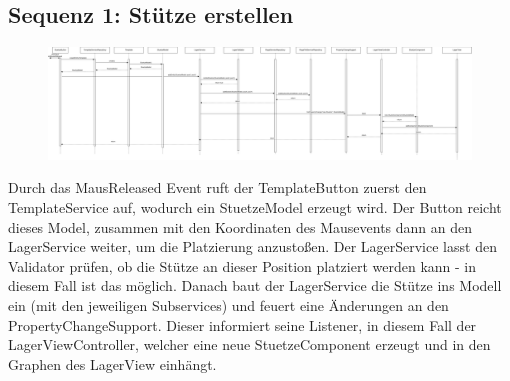 \subsection{Sequenz 1: Stütze erstellen}
\begin{figure}[H]
    \includegraphics[width=\linewidth]{images/laufzeitsicht/Sequenz_David.png}
    \label{fig:Sequenzdiagramm1}
\end{figure}
Durch das MausReleased Event ruft der TemplateButton zuerst den TemplateService auf, wodurch ein StuetzeModel erzeugt wird. Der Button reicht dieses Model, zusammen mit den Koordinaten des Mausevents dann an den LagerService weiter, um die Platzierung anzustoßen. Der LagerService lasst den Validator prüfen, ob die Stütze an dieser Position platziert werden kann - in diesem Fall ist das möglich. Danach baut der LagerService die Stütze ins Modell ein (mit den jeweiligen Subservices) und feuert eine Änderungen an den PropertyChangeSupport. Dieser informiert seine Listener, in diesem Fall der LagerViewController, welcher eine neue StuetzeComponent erzeugt und in den Graphen des LagerView einhängt.